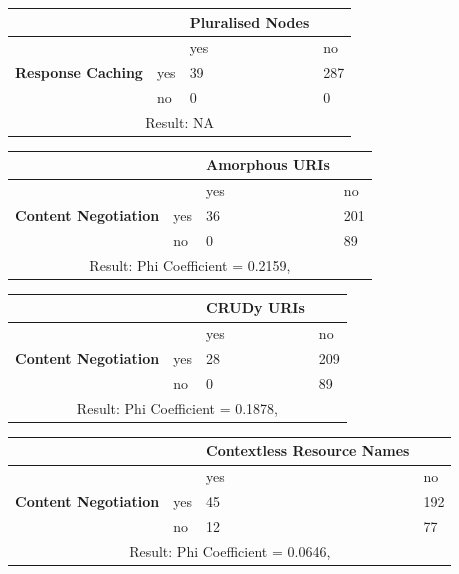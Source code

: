 \documentclass[a4paper,12pt]{article}
\begin{document}
\begin{center}
  \begin{tabular}{| p{60mm} | p{10mm} | p{35mm} | p{35mm} |}
  \hline
   & & \textbf{Pluralised Nodes} &
  \\
  \hline
  & & yes & no
  \\
  \hline
  \textbf{Response Caching} & yes & 39 & 287
  \\
  \hline
   & no & 0 & 0
  \\
  \hline
  \multicolumn{4}{|c|}{Result: NA}
  \\ \hline
  \end{tabular}
  \end{center}

\begin{center}
  \begin{tabular}{| p{60mm} | p{10mm} | p{35mm} | p{35mm} |}
  \hline
   & & \textbf{Amorphous URIs} &
  \\
  \hline
  & & yes & no
  \\
  \hline
  \textbf{Content Negotiation} & yes & 36 & 201
  \\
  \hline
   & no & 0 & 89
  \\
  \hline
  \multicolumn{4}{|c|}{Result: Phi Coefficient = 0.2159, }
  \\ \hline
  \end{tabular}
  \end{center}

\begin{center}
  \begin{tabular}{| p{60mm} | p{10mm} | p{35mm} | p{35mm} |}
  \hline
   & & \textbf{CRUDy URIs} &
  \\
  \hline
  & & yes & no
  \\
  \hline
  \textbf{Content Negotiation} & yes & 28 & 209
  \\
  \hline
   & no & 0 & 89
  \\
  \hline
  \multicolumn{4}{|c|}{Result: Phi Coefficient = 0.1878, }
  \\ \hline
  \end{tabular}
  \end{center}

\begin{center}
  \begin{tabular}{| p{60mm} | p{10mm} | p{35mm} | p{35mm} |}
  \hline
   & & \textbf{Contextless Resource Names} &
  \\
  \hline
  & & yes & no
  \\
  \hline
  \textbf{Content Negotiation} & yes & 45 & 192
  \\
  \hline
   & no & 12 & 77
  \\
  \hline
  \multicolumn{4}{|c|}{Result: Phi Coefficient = 0.0646, }
  \\ \hline
  \end{tabular}
  \end{center}
\end{document}
